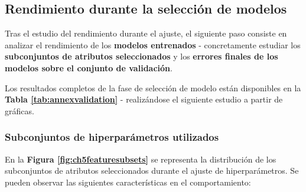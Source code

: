 \subsection{Rendimiento durante la selección de modelos}

Tras el estudio del rendimiento durante el ajuste, el siguiente paso consiste en analizar el rendimiento de los \textbf{modelos entrenados} - concretamente estudiar los \textbf{subconjuntos de atributos seleccionados} y los \textbf{errores finales de los modelos sobre el conjunto de validación}.

Los resultados completos de la fase de selección de modelo están disponibles en la \textbf{Tabla \ref{tab:annexvalidation}} - realizándose el siguiente estudio a partir de gráficas.

\subsubsection{Subconjuntos de hiperparámetros utilizados}

En la \textbf{Figura \ref{fig:ch5featuresubsets}} se representa la distribución de los subconjuntos de atributos seleccionados durante el ajuste de hiperparámetros. Se pueden observar las siguientes características en el comportamiento:

